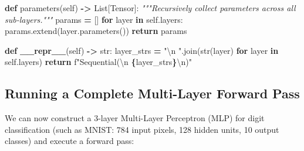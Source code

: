 \documentclass[
  letterpaper,
]{scrbook}
\newenvironment{Shaded}{\begin{snugshade}}{\end{snugshade}}
\newcommand{\BuiltInTok}[1]{#1}
\newcommand{\CharTok}[1]{\textcolor[rgb]{0.31,0.60,0.02}{#1}}
\newcommand{\CommentTok}[1]{\textcolor[rgb]{0.56,0.35,0.01}{\textit{#1}}}
\newcommand{\ControlFlowTok}[1]{\textcolor[rgb]{0.13,0.29,0.53}{\textbf{#1}}}
\newcommand{\FunctionTok}[1]{\textcolor[rgb]{0.13,0.29,0.53}{\textbf{#1}}}
\newcommand{\KeywordTok}[1]{\textcolor[rgb]{0.13,0.29,0.53}{\textbf{#1}}}
\newcommand{\NormalTok}[1]{#1}
\newcommand{\OperatorTok}[1]{\textcolor[rgb]{0.81,0.36,0.00}{\textbf{#1}}}
\newcommand{\SpecialCharTok}[1]{\textcolor[rgb]{0.81,0.36,0.00}{\textbf{#1}}}
\newcommand{\SpecialStringTok}[1]{\textcolor[rgb]{0.31,0.60,0.02}{#1}}
\newcommand{\StringTok}[1]{\textcolor[rgb]{0.31,0.60,0.02}{#1}}
\newcommand{\VariableTok}[1]{\textcolor[rgb]{0.00,0.00,0.00}{#1}}
\begin{document}
\begin{Shaded}
\begin{Highlighting}[]
    \KeywordTok{def}\NormalTok{ parameters(}\VariableTok{self}\NormalTok{) }\OperatorTok{{-}\textgreater{}}\NormalTok{ List[Tensor]:}
        \CommentTok{"""Recursively collect parameters across all sub{-}layers."""}
\NormalTok{        params }\OperatorTok{=}\NormalTok{ []}
        \ControlFlowTok{for}\NormalTok{ layer }\KeywordTok{in} \VariableTok{self}\NormalTok{.layers:}
\NormalTok{            params.extend(layer.parameters())}
        \ControlFlowTok{return}\NormalTok{ params}

    \KeywordTok{def} \FunctionTok{\_\_repr\_\_}\NormalTok{(}\VariableTok{self}\NormalTok{) }\OperatorTok{{-}\textgreater{}} \BuiltInTok{str}\NormalTok{:}
\NormalTok{        layer\_strs }\OperatorTok{=} \StringTok{"}\CharTok{\textbackslash{}n}\StringTok{  "}\NormalTok{.join(}\BuiltInTok{str}\NormalTok{(layer) }\ControlFlowTok{for}\NormalTok{ layer }\KeywordTok{in} \VariableTok{self}\NormalTok{.layers)}
        \ControlFlowTok{return} \SpecialStringTok{f"Sequential(}\CharTok{\textbackslash{}n}\SpecialStringTok{  }\SpecialCharTok{\{}\NormalTok{layer\_strs}\SpecialCharTok{\}}\CharTok{\textbackslash{}n}\SpecialStringTok{)"}
\end{Highlighting}
\end{Shaded}

\subsection{Running a Complete Multi-Layer Forward
Pass}\label{running-a-complete-multi-layer-forward-pass}

We can now construct a 3-layer Multi-Layer Perceptron (MLP) for digit
classification (such as MNIST: 784 input pixels, 128 hidden units, 10
output classes) and execute a forward pass:
\end{document}
